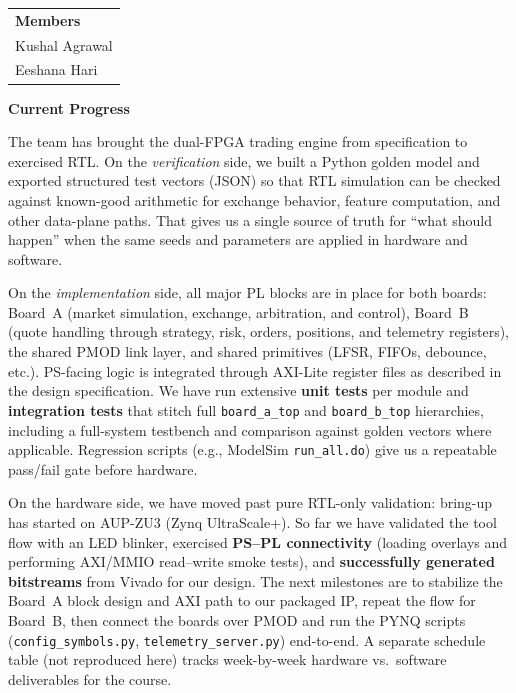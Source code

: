 \documentclass[11pt,twocolumn]{article}
\newcommand{\Rsec}[1]{%
  \par\addvspace{0.65\baselineskip plus 0.12\baselineskip minus 0.08\baselineskip}%
  {\noindent\large\bfseries #1\par}%
  \addvspace{0.42\baselineskip plus 0.06\baselineskip}%
}
\begin{document}
\thispagestyle{fancy}

\noindent\begin{tabular}[t]{@{}l@{}}
  {\large\bfseries Members} \\[0.28em]
  Kushal Agrawal \\
  Eeshana Hari
\end{tabular}

\Rsec{Current Progress}

The team has brought the dual-FPGA trading engine from specification to exercised RTL. On the \emph{verification} side, we built a Python golden model and exported structured test vectors (JSON) so that RTL simulation can be checked against known-good arithmetic for exchange behavior, feature computation, and other data-plane paths. That gives us a single source of truth for ``what should happen'' when the same seeds and parameters are applied in hardware and software.

On the \emph{implementation} side, all major PL blocks are in place for both boards: Board~A (market simulation, exchange, arbitration, and control), Board~B (quote handling through strategy, risk, orders, positions, and telemetry registers), the shared PMOD link layer, and shared primitives (LFSR, FIFOs, debounce, etc.). PS-facing logic is integrated through AXI-Lite register files as described in the design specification. We have run extensive \textbf{unit tests} per module and \textbf{integration tests} that stitch full \texttt{board\_a\_top} and \texttt{board\_b\_top} hierarchies, including a full-system testbench and comparison against golden vectors where applicable. Regression scripts (e.g., ModelSim \texttt{run\_all.do}) give us a repeatable pass/fail gate before hardware.

On the hardware side, we have moved past pure RTL-only validation: bring-up has started on AUP-ZU3 (Zynq UltraScale+). So far we have validated the tool flow with an LED blinker, exercised \textbf{PS--PL connectivity} (loading overlays and performing AXI/MMIO read--write smoke tests), and \textbf{successfully generated bitstreams} from Vivado for our design. The next milestones are to stabilize the Board~A block design and AXI path to our packaged IP, repeat the flow for Board~B, then connect the boards over PMOD and run the PYNQ scripts (\texttt{config\_symbols.py}, \texttt{telemetry\_server.py}) end-to-end. A separate schedule table (not reproduced here) tracks week-by-week hardware vs.\ software deliverables for the course.
\end{document}
